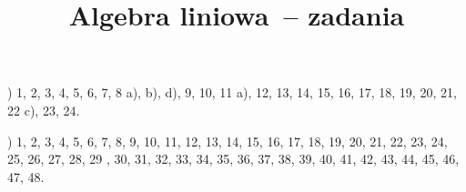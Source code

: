 \documentclass[a4paper,11pt]{article}
\title{Algebra liniowa~-- zadania}
\begin{document}





\maketitle %







\noindent
{}) 1, 2, 3, 4, 5, 6, 7, 8 a), b), d), 9, 10, 11 a), 12,
13, 14, 15, 16, 17, 18, 19, 20, 21, 22 c), 23, 24.

\vspace{\spaceFour}



\noindent
{}) 1, 2, 3, 4, 5, 6, 7, 8, 9, 10, 11, 12, 13, 14, 15, 16,
17, 18, 19, 20, 21, 22, 23, 24, 25, 26, 27, 28, 29 , 30, 31, 32, 33, 34,
35, 36, 37, 38, 39, 40, 41, 42, 43, 44, 45, 46, 47, 48.














\end{document}
